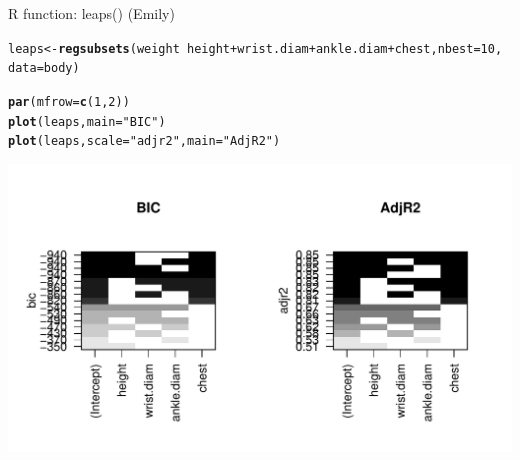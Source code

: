 \documentclass[table]{beamer}\usepackage[]{graphicx}\usepackage[]{color}
\makeatletter
\def\maxwidth{ %
  \ifdim\Gin@nat@width>\linewidth
    \linewidth
  \else
    \Gin@nat@width
  \fi
}
\newcommand{\hlnum}[1]{\textcolor[rgb]{0.686,0.059,0.569}{#1}}%
\newcommand{\hlstr}[1]{\textcolor[rgb]{0.192,0.494,0.8}{#1}}%
\newcommand{\hlopt}[1]{\textcolor[rgb]{0,0,0}{#1}}%
\newcommand{\hlstd}[1]{\textcolor[rgb]{0.345,0.345,0.345}{#1}}%
\newcommand{\hlkwb}[1]{\textcolor[rgb]{0.69,0.353,0.396}{#1}}%
\newcommand{\hlkwc}[1]{\textcolor[rgb]{0.333,0.667,0.333}{#1}}%
\newcommand{\hlkwd}[1]{\textcolor[rgb]{0.737,0.353,0.396}{\textbf{#1}}}%
\newenvironment{kframe}{%
 \def\at@end@of@kframe{}%
 \ifinner\ifhmode%
  \def\at@end@of@kframe{\end{minipage}}%
  \begin{minipage}{\columnwidth}%
 \fi\fi%
 \def\FrameCommand##1{\hskip\@totalleftmargin \hskip-\fboxsep
 \colorbox{shadecolor}{##1}\hskip-\fboxsep
     \hskip-\linewidth \hskip-\@totalleftmargin \hskip\columnwidth}%
 \MakeFramed {\advance\hsize-\width
   \@totalleftmargin\z@ \linewidth\hsize
   \@setminipage}}%
 {\par\unskip\endMakeFramed%
 \at@end@of@kframe}
\newenvironment{knitrout}{}{} %
\makeatother
\begin{document}
\begin{frame}{R function: leaps() (Emily)}

\begin{knitrout}
\color{fgcolor}\begin{kframe}
\begin{alltt}
\hlstd{leaps} \hlkwb{<-} \hlkwd{regsubsets}\hlstd{(weight} \hlopt{~} \hlstd{height} \hlopt{+} \hlstd{wrist.diam} \hlopt{+} \hlstd{ankle.diam} \hlopt{+} \hlstd{chest,} \hlkwc{nbest} \hlstd{=} \hlnum{10}\hlstd{,}
    \hlkwc{data} \hlstd{= body)}

\hlkwd{par}\hlstd{(}\hlkwc{mfrow} \hlstd{=} \hlkwd{c}\hlstd{(}\hlnum{1}\hlstd{,} \hlnum{2}\hlstd{))}
\hlkwd{plot}\hlstd{(leaps,} \hlkwc{main} \hlstd{=} \hlstr{"BIC"}\hlstd{)}
\hlkwd{plot}\hlstd{(leaps,} \hlkwc{scale} \hlstd{=} \hlstr{"adjr2"}\hlstd{,} \hlkwc{main} \hlstd{=} \hlstr{"AdjR2"}\hlstd{)}
\end{alltt}
\end{kframe}
\includegraphics[width=\maxwidth]{figure/leap} 

\end{knitrout}


\end{frame}


\end{document}
